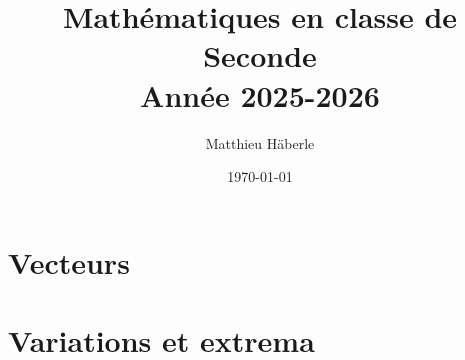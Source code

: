 \documentclass[a4paper, 12pt]{report}
\title{\Huge{Mathématiques en classe de Seconde}\\ Année 2025-2026}
\author{\huge{Matthieu Häberle}}
\date{\today}
\begin{document}
\maketitle
\newpage%
\tableofcontents
\pagebreak





















\chapter{Vecteurs}







\chapter{Variations et extrema}


\end{document}
